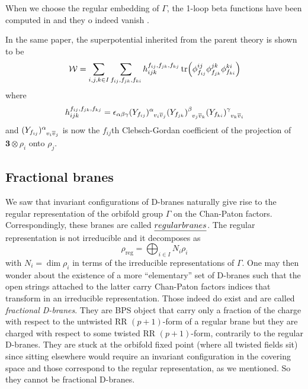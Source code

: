                 When we choose the regular embedding of $\Gamma$, the 1-loop beta functions have been computed in \cite{vafa1998} and they o indeed vanish \cite{vafa1998}.
                
                In the same paper, the superpotential inherited from the parent theory is shown to be
                \begin{equation}
                    \mathcal{W}=\sum_{i,j,k\in I}\sum_{f_{ij},f_{jk},f_{ki}}h^{f_{ij},f_{jk},f_{kj}}_{ijk}\tr(\phi^{ij}_{f_{ij}}\phi^{jk}_{f_{jk}}\phi^{ki}_{f_{ki}})
                \end{equation}
                where
                \begin{equation}
                    h^{f_{ij},f_{jk},f_{kj}}_{ijk} = \eps_{\alpha\beta\gamma}(Y_{f_{ij}})\indices{^\alpha_{v_i\bar{v}_j}}(Y_{f_{jk}})\indices{^\beta_{v_j\bar{v}_k}}(Y_{f_{ki}})\indices{^\gamma_{v_k\bar{v}_i}}
                \end{equation}
                and $(Y_{f_{ij}})\indices{^\alpha_{v_i\bar{v}_j}}$ is now the $f_{ij}$th Clebsch-Gordan coefficient of the projection of $\boldsymbol{3}\otimes\rho_i$ onto $\rho_j$.


    \subsection{Fractional branes}
        
        We saw that invariant configurations of D-branes naturally give rise to the regular representation of the orbifold group $\Gamma$ on the Chan-Paton factors. Correspondingly, these branes are called $\emph{regular branes}$. The regular representation is not irreducible and it decomposes as
        \begin{equation}
            \rho_{\text{reg}}=\bigoplus_{i\in I} N_i\rho_i
        \end{equation}
        with $N_i=\dim\rho_i$ in terms of the irreducible representations of $\Gamma$. One may then wonder about the existence of a more ``elementary'' set of D-branes such that the open strings attached to the latter carry Chan-Paton factors indices that transform in an irreducible representation. Those indeed do exist and are called \emph{fractional D-branes}. They are BPS object that carry only a fraction of the charge with respect to the untwisted RR $(p+1)$-form of a regular brane but they are charged with respect to some twisted RR $(p+1)$-form, contrarily to the regular D-branes. They are stuck at the orbifold fixed point (where all twisted fields sit) since sitting elsewhere would require an invariant configuration in the covering space and those correspond to the regular representation, as we mentioned. So they cannot be fractional D-branes.

